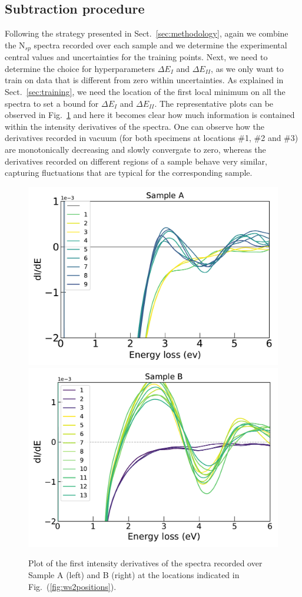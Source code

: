 \subsection{Subtraction procedure}

Following the strategy presented in Sect.~\ref{sec:methodology}, again we combine
the N$_{sp}$ spectra recorded over each sample and we determine the 
experimental central values and uncertainties for the training points.
%
Next, we need to determine the choice for hyperparameters $\Delta E_I$ and $\Delta E_{II}$,
as we only want to train on data that is different from zero within uncertainties.
%
As explained in Sect.~\ref{sec:training}, we need the location of the first local minimum
on all the spectra to set a bound for $\Delta E_I$ and $\Delta E_{II}$. 
%
The representative plots can be observed in Fig.~\ref{fig:derivatives} and here it becomes
clear how much information is contained within the intensity derivatives of the spectra.
%
One can observe how the derivatives recorded in vacuum (for both specimens at locations
\#1, \#2 and \#3) are monotonically decreasing and slowly convergate to zero, whereas
the derivatives recorded on different regions of a sample behave very similar, capturing fluctuations
that are typical for the corresponding sample.

\begin{figure}[H]
\begin{centering}
  \includegraphics[width=0.49\linewidth]{plots/Derivatives_sample_A.pdf}
  \includegraphics[width=0.49\linewidth]{plots/Derivatives_sample_B.pdf}
  \caption{Plot of the first intensity derivatives of the spectra
  recorded over Sample A (left) and B (right) at the locations
  indicated in Fig.~(\ref{fig:ws2positions}). }
\label{fig:derivatives}
\end{centering}
\end{figure}


